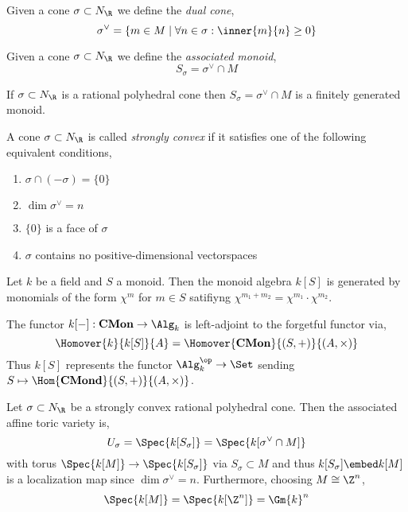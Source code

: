 \documentclass[12pt]{article}
\begin{document}
\begin{defn}
Given a cone $\sigma \subset N_\R$ we define the \textit{dual cone},
\[ \sigma^\vee = \{ m \in M \mid \forall n \in \sigma : \inner{m}{n} \ge 0 \} \]
\end{defn}

\begin{defn}
Given a cone $\sigma \subset N_\R$ we define the \textit{associated monoid},
\[ S_\sigma = \sigma^\vee \cap M \]
\end{defn}

\begin{lemma}[Gordon]
If $\sigma \subset N_\R$ is a rational polyhedral cone then $S_\sigma = \sigma^\vee \cap M$ is a finitely generated monoid. 
\end{lemma}

\begin{defn}
A cone $\sigma \subset N_\R$ is called \textit{strongly convex} if it satisfies one of the following equivalent conditions,
\begin{enumerate}
\item $\sigma \cap (-\sigma) = \{ 0 \}$
\item $\dim{\sigma^\vee} = n$
\item $\{ 0 \}$ is a face of $\sigma$
\item $\sigma$ contains no positive-dimensional vectorspaces
\end{enumerate}
\end{defn}

\begin{defn}
Let $k$ be a field and $S$ a monoid. Then the monoid algebra $k[S]$ is generated by monomials of the form $\chi^m$ for $m \in S$ satifiyng $\chi^{m_1 + m_2} = \chi^{m_1} \cdot \chi^{m_2}$. 
\end{defn}

\begin{rmk}
The functor $k[-] : \mathbf{CMon} \to \Alg_k$ is left-adjoint to the forgetful functor via,
\[ \Homover{k}{k[S]}{A} = \Homover{\mathbf{CMon}}{(S, +)}{(A, \times)} \]
Thus $k[S]$ represents the functor $\Alg_k^\op \to \Set$ sending $S \mapsto \Hom{\mathbf{CMond}}{(S, +)}{(A, \times)}$.
\end{rmk}

\begin{defn}
Let $\sigma \subset N_\R$ be a strongly convex rational polyhedral cone. Then the associated affine toric variety is,
\[ U_\sigma = \Spec{k[S_\sigma]} = \Spec{k[\sigma^\vee \cap M]} \]
with torus $\Spec{k[M]} \to \Spec{k[S_\sigma]}$ via $S_\sigma \subset M$ and thus $k[S_\sigma] \embed k[M]$ is a localization map since $\dim{\sigma^\vee} = n$. Furthermore, choosing $M \cong \Z^n$,
\[ \Spec{k[M]} = \Spec{k[\Z^n]} = \Gm{k}^n \]
\end{defn}
\end{document}

